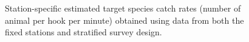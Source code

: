 \documentclass[12pt]{article}\usepackage[]{graphicx}\usepackage[]{color}
\begin{document}
\begin{figure}[htb]

{\centering {} 

}

\caption{Station-specific estimated target species catch rates (number of animal per hook per minute) obtained using data from both the fixed stations and stratified survey design.}\label{fig:target-spat}
\end{figure}
\end{document}
